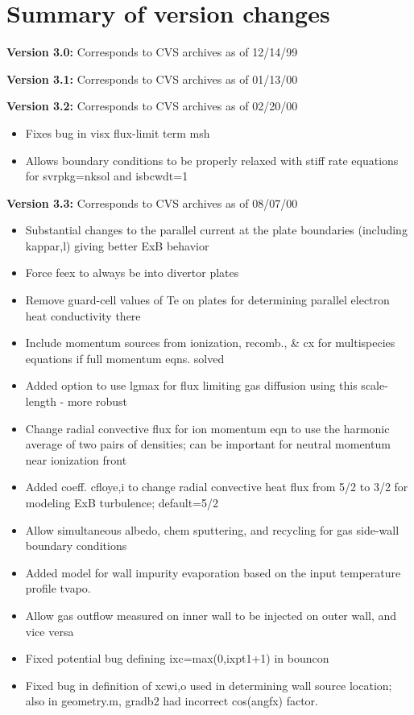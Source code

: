 \documentclass [12pt]{article}
\begin{document}
\section{Summary of version changes}
\baselineskip=15pt

\noindent\textbf{Version 3.0:} Corresponds to CVS archives as of 12/14/99

\noindent\textbf{Version 3.1:}    Corresponds to CVS archives as of 01/13/00

\noindent\textbf{Version 3.2:}    Corresponds to CVS archives as of 02/20/00
\begin{itemize}
      \item Fixes bug in visx flux-limit term msh
      \item Allows boundary conditions to be properly relaxed with
                  stiff rate equations for svrpkg=nksol and isbcwdt=1
\end{itemize}

\noindent\textbf{Version 3.3:}   Corresponds to CVS archives as of 08/07/00
\begin{itemize}
     \item Substantial changes to the parallel current at the plate
            boundaries (including kappar,l) giving better ExB behavior
     \item Force feex to always be into divertor plates
     \item Remove guard-cell values of Te on plates for determining
           parallel electron heat conductivity there
     \item Include momentum sources from ionization, recomb., \& cx
           for multispecies equations if full momentum eqns. solved
     \item Added option to use lgmax for flux limiting gas diffusion
           using this scale-length - more robust
     \item Change radial convective flux for ion momentum eqn to use
           the harmonic average of two pairs of densities; can be
           important for neutral momentum near ionization front
     \item Added coeff. cfloye,i to change radial convective heat flux
           from 5/2 to 3/2 for modeling ExB turbulence; default=5/2
     \item Allow simultaneous albedo, chem sputtering, and recycling
           for gas side-wall boundary conditions
     \item Added model for wall impurity evaporation based on the input
           temperature profile tvapo.
     \item Allow gas outflow measured on inner wall to be injected on
           outer wall, and vice versa
     \item Fixed potential bug defining ixc=max(0,ixpt1+1) in bouncon
     \item Fixed bug in definition of xcwi,o used in determining wall
           source location; also in geometry.m, gradb2 had incorrect
           cos(angfx) factor.
\end{itemize}
\end{document}
